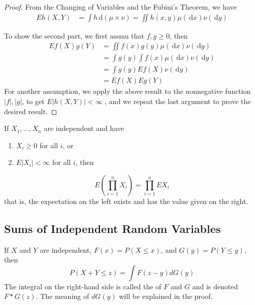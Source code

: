 \documentclass[../main.tex]{subfiles}
\begin{document}
\begin{proof}
    From the Changing of Variables and the Fubini's Theorem, we have \[
    \begin{aligned}
    Eh\left( X,Y \right)&= \int h \,\mathrm{d} \left( \mu \times \nu  \right)= \iint h\left( x,y \right)\mu \left( \,\mathrm{d} x \right)\nu \left( \,\mathrm{d} y \right)      
    \end{aligned}
    \]

    To show the second part, we first assmu that \(  f,g \ge 0  \), then \[
    \begin{aligned}
     Ef\left( X \right)g\left( Y \right)&= \iint f\left( x \right)g\left( y \right)\mu \left( \,\mathrm{d} x \right)\nu \left( \,\mathrm{d} y \right)\\ 
      &= \int g\left( y \right) \int f\left( x \right)\mu \left( \,\mathrm{d} x \right)\nu \left( \,\mathrm{d} y \right)\\ 
       &=  \int g\left( y \right)Ef\left( X \right)          \nu \left( \,\mathrm{d} y \right)\\ 
        &=  Ef\left( X \right)Eg\left( Y \right)   
    \end{aligned}
    \] 
    For another assumption, we apply the above result to the nonnegative function \(  \left| f \right|, \left| g \right|    \), to get \(  E\left| h\left( X,Y \right)  \right|< \infty   \)  , and we repeat the last argument to prove the desired result.
\end{proof}

\begin{corollary}{}{}
    
If $X_1, \dots, X_n$ are independent and have
\begin{enumerate}
    \item[(a)] $X_i \ge 0$ for all $i$, or
    \item[(b)] $E|X_i| < \infty$ for all $i$, then
\end{enumerate}
\[
E\left(\prod_{i=1}^n X_i\right) = \prod_{i=1}^n EX_i
\]
that is, the expectation on the left exists and has the value given on the right.
\end{corollary}

\subsection{Sums of Independent Random Variables}

\begin{theorem}{}{}
If $X$ and $Y$ are independent, $F(x) = P(X \leq x)$, and $G(y) = P(Y \leq y)$, then
\[
P(X + Y \leq z) = \int F(z - y) dG(y)
\]
The integral on the right-hand side is called the  of $F$ and $G$ and is denoted $F * G(z)$. The meaning of $dG(y)$ will be explained in the proof.
\end{theorem}
\end{document}
